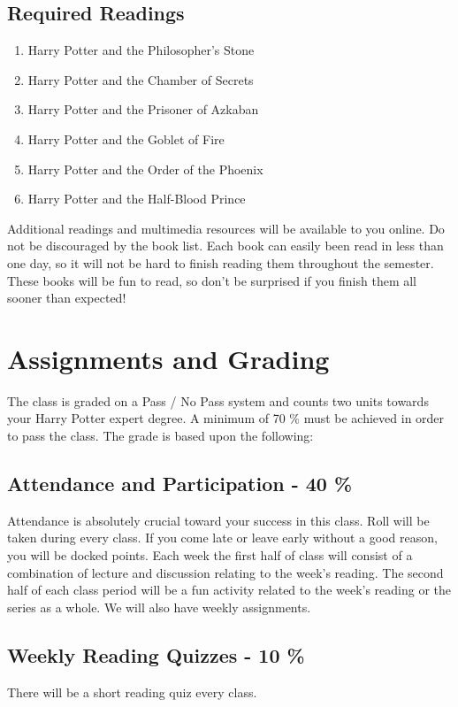 \documentclass{article}
\begin{document}
\subsection {Required Readings}

\begin{enumerate}
\item Harry Potter and the Philosopher’s Stone
\item Harry Potter and the Chamber of Secrets
\item Harry Potter and the Prisoner of Azkaban
\item Harry Potter and the Goblet of Fire
\item Harry Potter and the Order of the Phoenix
\item Harry Potter and the Half-Blood Prince
\end{enumerate}

Additional readings and multimedia resources will be available to you online.
Do not be discouraged by the book list. Each book can easily been read in less than one day, so it will not be hard to finish reading them throughout the semester. These books will be fun to read, so don’t be surprised if you finish them all sooner than expected!

\section*{Assignments and Grading}
	The class is graded on a Pass / No Pass system and counts two units towards your Harry Potter expert degree. A minimum of 70 \% must be achieved in order to pass the class. 
	The grade is based upon the following: 

\subsection*{Attendance and Participation - 40 \%}	
	Attendance is absolutely crucial toward your success in this class. Roll will be taken during every class. If you come late or leave early without a good reason, you will be docked points. Each week the first half of class will consist of a combination of lecture and discussion relating to the week’s reading. The second half of each class period will be a fun activity related to the week’s reading or the series as a whole. We will also have weekly assignments.

\subsection*{Weekly Reading Quizzes - 10 \%}
    There will be a short reading quiz every class.
	
\end{document}
